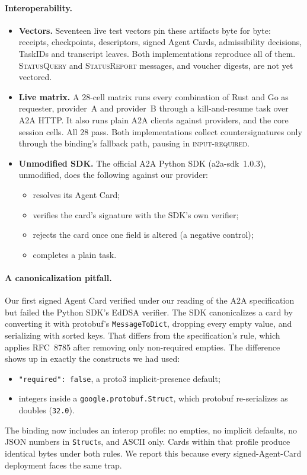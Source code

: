 \paragraph{Interoperability.}
\begin{itemize}
\item \textbf{Vectors.} Seventeen live test vectors pin these artifacts
  byte for byte: receipts, checkpoints, descriptors, signed Agent Cards,
  admissibility decisions, TaskIDs and transcript leaves. Both
  implementations reproduce all of them. \textsc{StatusQuery} and
  \textsc{StatusReport} messages, and voucher digests, are not yet
  vectored.
\item \textbf{Live matrix.} A 28-cell matrix runs every combination of
  Rust and Go as requester, provider~A and provider~B through a
  kill-and-resume task over A2A HTTP. It also runs plain A2A clients
  against \sys{} providers, and the core session cells. All 28 pass.
  Both implementations collect countersignatures only through the
  binding's fallback path, pausing in \textsc{input-required}.
\item \textbf{Unmodified SDK.} The official A2A Python SDK
  (a2a-sdk~1.0.3), unmodified, does the following against our provider:
  \begin{itemize}
  \item resolves its Agent Card;
  \item verifies the card's signature with the SDK's own verifier;
  \item rejects the card once one field is altered (a negative control);
  \item completes a plain task.
  \end{itemize}
\end{itemize}

\paragraph{A canonicalization pitfall.}
Our first signed Agent Card verified under our reading of the A2A
specification but failed the Python SDK's EdDSA verifier. The SDK
canonicalizes a card by converting it with protobuf's
\texttt{MessageToDict}, dropping every empty value, and serializing with
sorted keys. That differs from the specification's rule, which applies
RFC~8785 after removing only non-required empties. The difference shows
up in exactly the constructs we had used:
\begin{itemize}
\item \texttt{"required": false}, a proto3 implicit-presence default;
\item integers inside a \texttt{google.protobuf.Struct}, which protobuf
  re-serializes as doubles (\texttt{32.0}).
\end{itemize}
The binding now includes an interop profile: no empties, no implicit
defaults, no JSON numbers in \texttt{Struct}s, and ASCII only. Cards
within that profile produce identical bytes under both rules. We report
this because every signed-Agent-Card deployment faces the same trap.

